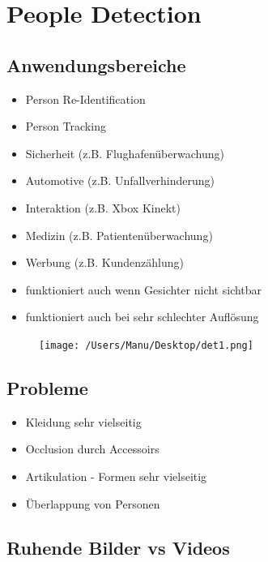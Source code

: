 \documentclass[paper=a4, fontsize=11pt]{scrartcl} %
\numberwithin{equation}{section} %
\numberwithin{figure}{section} %
\numberwithin{table}{section} %
\begin{document}
\section{People Detection}

\subsection{Anwendungsbereiche}

\begin{minipage}{0.55\textwidth}
\begin{itemize}
\item Person Re-Identification
\item Person Tracking
\item Sicherheit (z.B. Flughafenüberwachung)
\item Automotive (z.B. Unfallverhinderung)
\item Interaktion (z.B. Xbox Kinekt)
\item Medizin (z.B. Patientenüberwachung)
\item Werbung (z.B. Kundenzählung)
\item funktioniert auch wenn Gesichter nicht sichtbar
\item funktioniert auch bei sehr schlechter Auflösung
\end{itemize}
\end{minipage} \hfill
\begin{minipage}{0.4\textwidth}
\begin{figure}[H]
\texttt{[image: /Users/Manu/Desktop/det1.png]}
\end{figure}
\end{minipage}

\subsection{Probleme}

\begin{itemize}
\item Kleidung sehr vielseitig
\item Occlusion durch Accessoirs
\item Artikulation - Formen sehr vielseitig
\item Überlappung von Personen
\end{itemize}

\subsection{Ruhende Bilder vs Videos}
\end{document}
